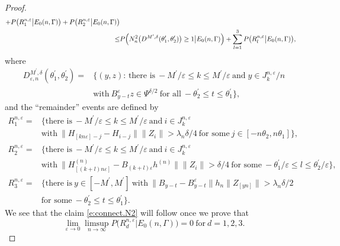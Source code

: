 \documentclass[10pt,a4paper]{amsart}
\newcommand{\eps}{\varepsilon}
\begin{document}
\begin{proof}
\begin{align*}
 + P\bigl( R_1^{n,
                    \eps}\big|E_0(n,\Gamma)\bigr)+P\bigl( R_2^{n,
       \eps}\big|E_0(n,\Gamma)\bigr) \\
  \leq &P\Bigl( N_n^2\bigl(D^{M^{\prime},\delta}(\theta_1^\prime,\theta_2^\prime)\bigr)\geq 1\big| E_0(n,\Gamma)\Bigr)
 + \sum_{l=1}^3 P\bigl( R_l^{n,
                    \eps}\big|E_0(n,\Gamma)\bigr), 
\end{align*}
where 
\begin{align*}
D_{\eps,n}^{M^\prime,\delta}(\theta_1^\prime,\theta_2^\prime) = &\bigl\{ (y,z):\,\text{there is} \ -M^\prime/\eps \leq k\leq
                   M^\prime/\eps \ \text{and} \; y\in J_k^{n,   \eps} /n \\
                   \
 & \text{with} \ B_{y-t}^\eps z\in \Psi^{\delta/2} \ \text{for all} \
  -\theta_2^\prime\leq t\leq \theta_1^\prime\bigr\}, 
\end{align*}
and the ``remainder'' events are defined by 
\begin{align*}
  R_1^{n, \eps}=& \bigl\{ \text{there is} \ -M^\prime/\eps \leq k\leq
                   M^\prime/\eps \ \text{and} \ i\in J_k^{n,
   \eps}  \\
   &\text{with} \ \| H_{[kn\eps]-j}-H_{i-j}\|\| Z_i\|
                          >\lambda_n\delta/4 \ \text{for some} \ j\in
                           [-n\theta_2,n\theta_1]\bigr\}, \\
 R_2^{n, \eps}=& \bigl\{ \text{there is} \   -M^\prime/\eps \leq k\leq
                   M^\prime/\eps \ \text{and} \ i\in J_k^{n,
   \eps} \\
&\text{with}  \ \|H^{(n)}_{[(k+l)n\eps]} -B_{(k+l)\eps}
                  h^{(n)}\|\|Z_i\|>\delta/4 \ 
                     \text{for some} \ -\theta_1^\prime/\eps\leq
                    l\leq\theta_2^\prime/\eps \bigr\}, \\
R_3^{n, \eps}=& \bigl\{ \text{there is} \ y\in [-M^{\prime},M^{\prime}] \
  \text{with} \ \| B_{y-t}-B_{y-t}^\eps\|h_n \|
                Z_{[yn]}\|>\lambda_n\delta/2 \\
   &\text{for some} \
                -\theta_2^\prime\leq t\leq \theta_1^\prime \bigr\}. 
   \end{align*}
We see that the claim \eqref{e:connect.N2} will follow once we prove
that 
   \begin{equation} \label{e:remainders.small}
 \lim_{\eps\to 0} \limsup_{n\to\infty} P\bigl( R_d^{n,
                    \eps}\big|E_0(n,\Gamma)\bigr) =0 \ \text{for} \ d=1,2,3.
                \end{equation}


\end{proof}
\end{document}
